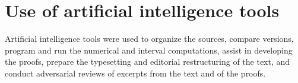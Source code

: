 \section*{Use of artificial intelligence tools}
Artificial intelligence tools were used to organize the sources, compare versions, program and run the
numerical and interval computations, assist in developing the proofs, prepare the typesetting and
editorial restructuring of the text, and conduct adversarial reviews of excerpts from the text and of the
proofs.
